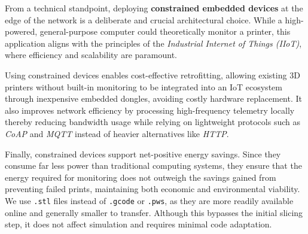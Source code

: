 \newpage

From a technical standpoint, deploying \textbf{constrained embedded devices} at the edge of the network is a deliberate and crucial architectural choice. While a high-powered, general-purpose computer could theoretically monitor a printer, this application aligns with the principles of the \textit{Industrial Internet of Things (IIoT)}, where efficiency and scalability are paramount.

Using constrained devices enables cost-effective retrofitting, allowing existing 3D printers without built-in monitoring to be integrated into an IoT ecosystem through inexpensive embedded dongles, avoiding costly hardware replacement. It also improves network efficiency by processing high-frequency telemetry locally thereby reducing bandwidth usage while relying on lightweight protocols such as \textit{CoAP} and \textit{MQTT} instead of heavier alternatives like \textit{HTTP}.

Finally, constrained devices support net-positive energy savings. Since they consume far less power than traditional computing systems, they ensure that the energy required for monitoring does not outweigh the savings gained from preventing failed prints, maintaining both economic and environmental viability. We use \texttt{.stl} files instead of \texttt{.gcode} or \texttt{.pws}, as they are more readily available online and generally smaller to transfer. Although this bypasses the initial slicing step, it does not affect simulation and requires minimal code adaptation.  